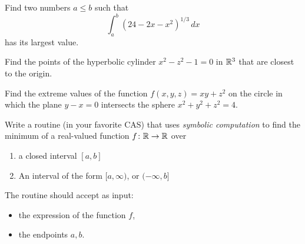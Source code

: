\begin{problem}[Basic]
Find two numbers $a \leq b$ such that 
\begin{equation*}
\int_a^b (24-2x-x^2)^{1/3}\, dx
\end{equation*}
has its largest value.
\end{problem}

\begin{problem}[Basic] %
Find the points of the hyperbolic cylinder $x^2-z^2-1=0$ in $\mathbb{R}^3$ that are closest to the origin.
\end{problem}

\begin{problem}[Intermediate]
Find the extreme values of the function $f(x,y,z)=xy+z^2$ on the circle in which the plane $y-x=0$ intersects the sphere $x^2+y^2+z^2=4$.
\end{problem}

\begin{problem}[CAS]
Write a routine (in your favorite CAS) that uses \emph{symbolic computation} to find the minimum of a real-valued function $f \colon \mathbb{R} \to \mathbb{R}$ over 
\begin{enumerate}
	\item a closed interval $[a,b]$
	\item An interval of the form $[a,\infty)$, or $(-\infty, b]$
\end{enumerate}
The routine should accept as input:
\begin{itemize}
	\item the expression of the function $f$,
	\item the endpoints $a,b$.
\end{itemize}
\end{problem}